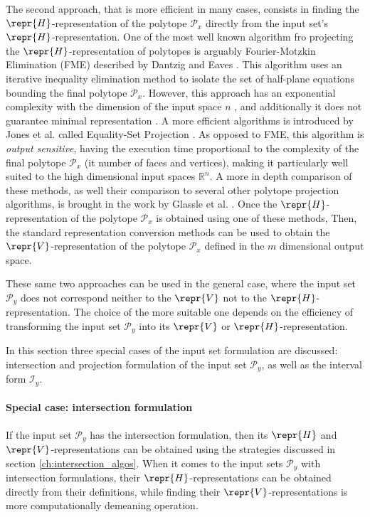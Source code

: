 The second approach, that is more efficient in many cases, consists in finding the $\repr{H}$-representation of the polytope $\mathcal{P}_x$ directly from the input set's $\repr{H}$-representation. One of the most well known algorithm fro projecting the $\repr{H}$-representation of polytopes is arguably Fourier-Motzkin Elimination (FME) described by Dantzig and Eaves \cite{dantzig1973fourier}.  This algorithm uses an iterative inequality elimination method to isolate the set of half-plane equations bounding the final polytope $\mathcal{P}_x$. However, this approach has an exponential complexity with the dimension of the input space $n$ \cite{Talaashrafi2020complexity}, and additionally it does not guarantee minimal representation \cite{Monniaux2010}. A more efficient algorithms is introduced by Jones et al. called Equality-Set Projection \cite{jones2004equality}. As opposed to FME, this algorithm is \textit{output sensitive}, having the execution time proportional to the complexity of the final polytope $\mathcal{P}_x$ (it number of faces and vertices), making it particularly well suited to the high dimensional input spaces $\mathbb{R}^n$. A more in depth comparison of these methods, as well their comparison to several other polytope projection algorithms, is brought in the work by Glassle et al. \cite{Gl_le_2018}. Once the $\repr{H}$-representation of the polytope $\mathcal{P}_x$ is obtained using one of these methods, Then, the standard representation conversion methods can be used to obtain the $\repr{V}$-representation of the polytope $\mathcal{P}_x$ defined in the $m$ dimensional output space.

These same two approaches can be used in the general case, where the input set $\mathcal{P}_y$ does not correspond neither to the $\repr{V}$ not to the $\repr{H}$-representation. The choice of the more suitable one depends on the efficiency of transforming the input set $\mathcal{P}_y$ into its $\repr{V}$ or $\repr{H}$-representation. 

In this section three special cases of the input set formulation are discussed: intersection and projection formulation of the input set $\mathcal{P}_y$, as well as the interval form $\mathcal{I}_y$.

\paragraph*{Special case: intersection formulation} If the input set $\mathcal{P}_y$ has the intersection formulation, then its $\repr{H}$ and $\repr{V}$-representations can be obtained using the strategies discussed in section \ref{ch:intersection_algos}. When it comes to the input sets $\mathcal{P}_y$ with intersection formulations,  their $\repr{H}$-representations can be obtained directly from their definitions, while finding their $\repr{V}$-representations is more computationally demeaning operation.


